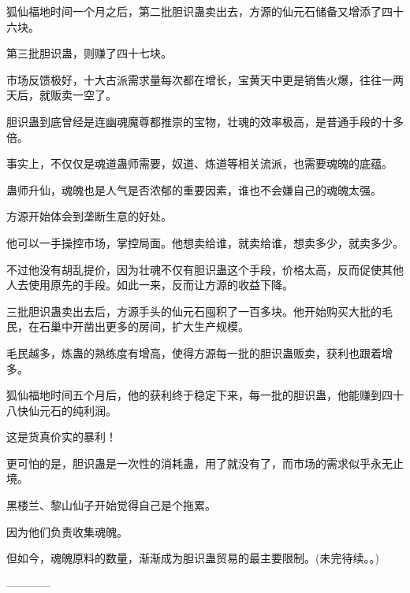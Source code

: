 \begin{this_body}
狐仙福地时间一个月之后，第二批胆识蛊卖出去，方源的仙元石储备又增添了四十六块。

第三批胆识蛊，则赚了四十七块。

市场反馈极好，十大古派需求量每次都在增长，宝黄天中更是销售火爆，往往一两天后，就贩卖一空了。

胆识蛊到底曾经是连幽魂魔尊都推崇的宝物，壮魂的效率极高，是普通手段的十多倍。

事实上，不仅仅是魂道蛊师需要，奴道、炼道等相关流派，也需要魂魄的底蕴。

蛊师升仙，魂魄也是人气是否浓郁的重要因素，谁也不会嫌自己的魂魄太强。

方源开始体会到垄断生意的好处。

他可以一手操控市场，掌控局面。他想卖给谁，就卖给谁，想卖多少，就卖多少。

不过他没有胡乱提价，因为壮魂不仅有胆识蛊这个手段，价格太高，反而促使其他人去使用原先的手段。如此一来，反而让方源的收益下降。

三批胆识蛊卖出去后，方源手头的仙元石囤积了一百多块。他开始购买大批的毛民，在石巢中开凿出更多的房间，扩大生产规模。

毛民越多，炼蛊的熟练度有增高，使得方源每一批的胆识蛊贩卖，获利也跟着增多。

狐仙福地时间五个月后，他的获利终于稳定下来，每一批的胆识蛊，他能赚到四十八快仙元石的纯利润。

这是货真价实的暴利！

更可怕的是，胆识蛊是一次性的消耗蛊，用了就没有了，而市场的需求似乎永无止境。

黑楼兰、黎山仙子开始觉得自己是个拖累。

因为他们负责收集魂魄。

但如今，魂魄原料的数量，渐渐成为胆识蛊贸易的最主要限制。(未完待续。。)

------------

\end{this_body}

